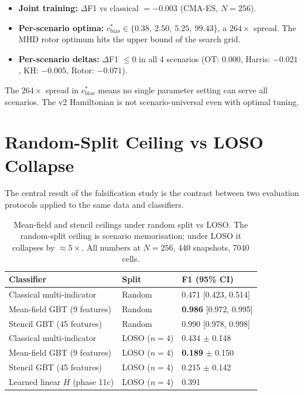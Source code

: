 \documentclass[12pt, a4paper, oneside]{report}
\begin{document}
\begin{itemize}
    \item \textbf{Joint training:} $\Delta$F1 vs classical $= -0.003$ (CMA-ES, $N = 256$).
    \item \textbf{Per-scenario optima:} $c_\text{bias}^* \in \{0.38,\ 2.50,\ 5.25,\ 99.43\}$, a $264\times$ spread. The MHD rotor optimum hits the upper bound of the search grid.
    \item \textbf{Per-scenario deltas:} $\Delta$F1 $\leq 0$ in all 4 scenarios (OT: $0.000$, Harris: $-0.021$, KH: $-0.005$, Rotor: $-0.071$).
\end{itemize}

The $264\times$ spread in $c_\text{bias}^*$ means no single parameter setting can serve all scenarios. The v2 Hamiltonian is not scenario-universal even with optimal tuning.

\section{Random-Split Ceiling vs LOSO Collapse}
\label{sec:ceiling-collapse}

The central result of the falsification study is the contrast between two evaluation protocols applied to the same data and classifiers.

\begin{table}[H]
\centering
\caption{Mean-field and stencil ceilings under random split vs LOSO. The random-split ceiling is scenario memorisation; under LOSO it collapses by $\approx 5\times$. All numbers at $N = 256$, 440 snapshots, 7040 cells.}
\label{tab:ceiling-collapse}
\begin{tabular}{lll}
\toprule
\textbf{Classifier} & \textbf{Split} & \textbf{F1 (95\% CI)} \\
\midrule
Classical multi-indicator & Random & 0.471 [0.423, 0.514] \\
Mean-field GBT (9 features) & Random & \textbf{0.986} [0.972, 0.995] \\
Stencil GBT (45 features) & Random & 0.990 [0.978, 0.998] \\
\midrule
Classical multi-indicator & LOSO ($n=4$) & 0.434 $\pm$ 0.148 \\
Mean-field GBT (9 features) & LOSO ($n=4$) & \textbf{0.189} $\pm$ 0.150 \\
Stencil GBT (45 features) & LOSO ($n=4$) & 0.215 $\pm$ 0.142 \\
Learned linear $H$ (phase 11c) & LOSO ($n=4$) & 0.391 \\
\bottomrule
\end{tabular}
\end{table}
\end{document}
